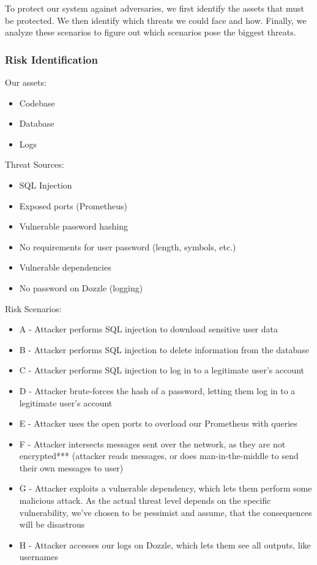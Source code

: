 To protect our system against adversaries, we first identify the assets that must be protected. We then identify which threats we could face and how. Finally, we analyze these scenarios to figure out which scenarios pose the biggest threats.

\subsubsection{Risk Identification}
Our assets:
\begin{itemize}
    \item Codebase
    \item Database
    \item Logs
\end{itemize}

Threat Sources:
\begin{itemize}
    \item SQL Injection
    \item Exposed ports (Prometheus)
    \item Vulnerable password hashing
    \item No requirements for user password (length, symbols, etc.)
    \item Vulnerable dependencies
    \item No password on Dozzle (logging)
\end{itemize}

Risk Scenarios:
\begin{itemize}
    \item A - Attacker performs SQL injection to download sensitive user data
    \item B - Attacker performs SQL injection to delete information from the database
    \item C - Attacker performs SQL injection to log in to a legitimate user's account
    \item D - Attacker brute-forces the hash of a password, letting them log in to a legitimate user's account
    \item E - Attacker uses the open ports to overload our Prometheus with queries
    \item F - Attacker intersects messages sent over the network, as they are not encrypted*** (attacker reads messages, or does man-in-the-middle to send their own messages to user)
    \item G - Attacker exploits a vulnerable dependency, which lets them perform some malicious attack. As the actual threat level depends on the specific vulnerability, we've chosen to be pessimist and assume, that the consequences will be disastrous
    \item H - Attacker accesses our logs on Dozzle, which lets them see all outputs, like usernames
\end{itemize}

